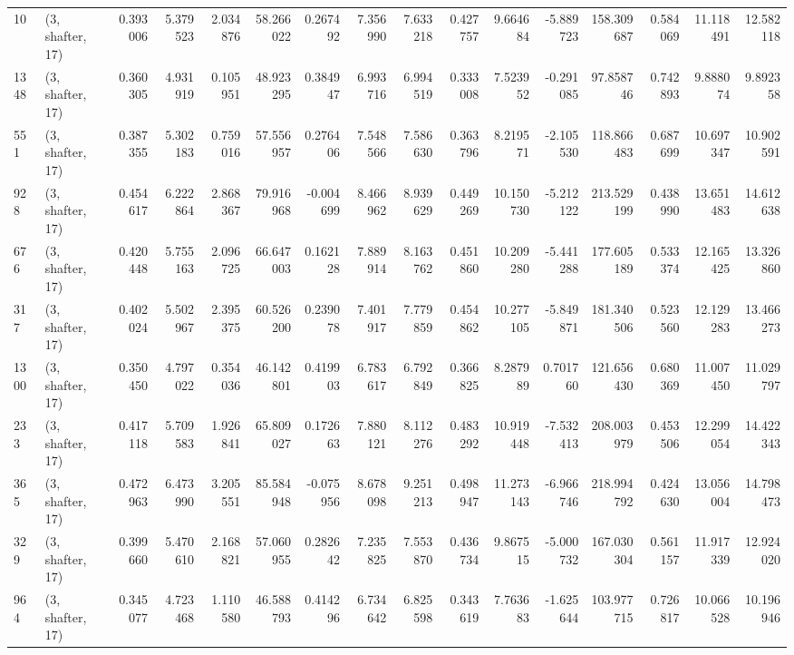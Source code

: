 \begin{tabular}{llrrrrrrrrrrrrrr}
10   &  (3, shafter, 17) &   0.393006 &   5.379523 &   2.034876 &     58.266022 &    0.267492 &    7.356990 &    7.633218 &  0.427757 &   9.664684 &  -5.889723 &   158.309687 &   0.584069 &  11.118491 &  12.582118 \\
1348 &  (3, shafter, 17) &   0.360305 &   4.931919 &   0.105951 &     48.923295 &    0.384947 &    6.993716 &    6.994519 &  0.333008 &   7.523952 &  -0.291085 &    97.858746 &   0.742893 &   9.888074 &   9.892358 \\
551  &  (3, shafter, 17) &   0.387355 &   5.302183 &   0.759016 &     57.556957 &    0.276406 &    7.548566 &    7.586630 &  0.363796 &   8.219571 &  -2.105530 &   118.866483 &   0.687699 &  10.697347 &  10.902591 \\
928  &  (3, shafter, 17) &   0.454617 &   6.222864 &   2.868367 &     79.916968 &   -0.004699 &    8.466962 &    8.939629 &  0.449269 &  10.150730 &  -5.212122 &   213.529199 &   0.438990 &  13.651483 &  14.612638 \\
676  &  (3, shafter, 17) &   0.420448 &   5.755163 &   2.096725 &     66.647003 &    0.162128 &    7.889914 &    8.163762 &  0.451860 &  10.209280 &  -5.441288 &   177.605189 &   0.533374 &  12.165425 &  13.326860 \\
317  &  (3, shafter, 17) &   0.402024 &   5.502967 &   2.395375 &     60.526200 &    0.239078 &    7.401917 &    7.779859 &  0.454862 &  10.277105 &  -5.849871 &   181.340506 &   0.523560 &  12.129283 &  13.466273 \\
1300 &  (3, shafter, 17) &   0.350450 &   4.797022 &   0.354036 &     46.142801 &    0.419903 &    6.783617 &    6.792849 &  0.366825 &   8.287989 &   0.701760 &   121.656430 &   0.680369 &  11.007450 &  11.029797 \\
233  &  (3, shafter, 17) &   0.417118 &   5.709583 &   1.926841 &     65.809027 &    0.172663 &    7.880121 &    8.112276 &  0.483292 &  10.919448 &  -7.532413 &   208.003979 &   0.453506 &  12.299054 &  14.422343 \\
365  &  (3, shafter, 17) &   0.472963 &   6.473990 &   3.205551 &     85.584948 &   -0.075956 &    8.678098 &    9.251213 &  0.498947 &  11.273143 &  -6.966746 &   218.994792 &   0.424630 &  13.056004 &  14.798473 \\
329  &  (3, shafter, 17) &   0.399660 &   5.470610 &   2.168821 &     57.060955 &    0.282642 &    7.235825 &    7.553870 &  0.436734 &   9.867515 &  -5.000732 &   167.030304 &   0.561157 &  11.917339 &  12.924020 \\
964  &  (3, shafter, 17) &   0.345077 &   4.723468 &   1.110580 &     46.588793 &    0.414296 &    6.734642 &    6.825598 &  0.343619 &   7.763683 &  -1.625644 &   103.977715 &   0.726817 &  10.066528 &  10.196946 \\

\end{tabular}
